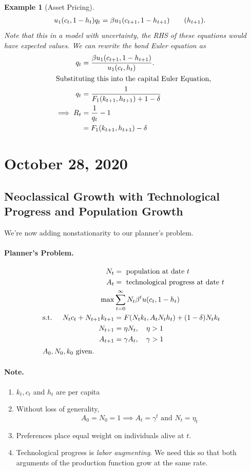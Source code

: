 \documentclass[11pt]{article}
\newtheorem*{example}{Example}
\begin{document}
\begin{example}[Asset Pricing]
\begin{align*}
u_1(c_t, 1 - h_t) q_t &= \beta u_1(c_{t + 1}, 1 - h_{t+ 1})\tag{$h_{t + 1}$}.
\end{align*}
Note that this in a model with uncertainty, the RHS of these equations would have expected values. We can rewrite the bond Euler equation as
\begin{align*}
q_t &= \frac{\beta u_1(c_{t + 1}, 1 - h_{t + 1})}{u_1(c_t, h_t)}.\\
\intertext{Substituting this into the capital Euler Equation,}
q_t &= \frac{1}{F_1(k_{t + 1}, h_{t + 1}) + 1 - \delta}\\
\implies R_t &= \frac{1}{q_t} - 1\\
&= F_1(k_{t + 1}, h_{t + 1}) - \delta
\end{align*}
\end{example}
\section{October 28, 2020}
\label{sec:orga289e8d}
\subsection{Neoclassical Growth with Technological Progress and Population Growth}
\label{sec:org79a2fa4}
We're now adding nonstationarity to our planner's problem.
\paragraph{Planner's Problem.}
\begin{align*}
N_t &= \text{ population at date } t\\
A_t &= \text{ technological progress at date } t\\
\max &\sum^\infty_{t = 0} N_t \beta^t u(c_t, 1 - h_t)\\
\text{s.t. }\quad N_t c_t + N_{t + 1} k_{t + 1} &= F(N_t k_t, A_t N_t h_t) + (1 - \delta) N_t k_t\\
N_{t + 1} &= \eta N_t, \quad \eta > 1\\
A_{t + 1} &= \gamma A_t, \quad \gamma > 1\\
\intertext{$A_0, N_0, k_0$ given.}
\end{align*}

\paragraph{Note.}

\begin{enumerate}
\item $k_t, c_t$ and $h_t$ are per capita
\item Without loss of generality,
\[
A_0 = N_0 = 1 \implies A_t = \gamma^t \text{ and } N_t = \eta_t
\]
\item Preferences place equal weight on individuals alive at $t$.
\item Technological progress is \emph{labor augmenting}. We need this so that both arguments of the production function grow at the same rate.
\end{enumerate}
\end{document}

